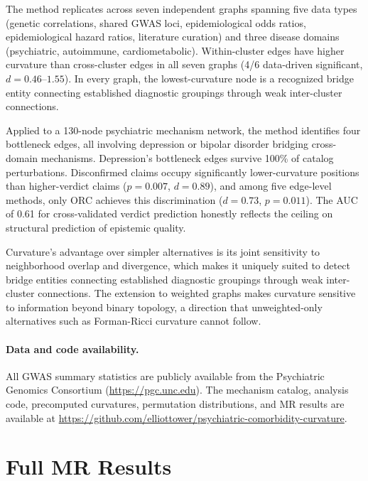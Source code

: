 \documentclass[11pt]{article}
\begin{document}
The method replicates across seven independent graphs spanning five data types (genetic correlations, shared GWAS loci, epidemiological odds ratios, epidemiological hazard ratios, literature curation) and three disease domains (psychiatric, autoimmune, cardiometabolic). Within-cluster edges have higher curvature than cross-cluster edges in all seven graphs (4/6 data-driven significant, $d = 0.46$--$1.55$). In every graph, the lowest-curvature node is a recognized bridge entity connecting established diagnostic groupings through weak inter-cluster connections.

Applied to a 130-node psychiatric mechanism network, the method identifies four bottleneck edges, all involving depression or bipolar disorder bridging cross-domain mechanisms. Depression's bottleneck edges survive 100\% of catalog perturbations. Disconfirmed claims occupy significantly lower-curvature positions than higher-verdict claims ($p = 0.007$, $d = 0.89$), and among five edge-level methods, only ORC achieves this discrimination ($d = 0.73$, $p = 0.011$). The AUC of 0.61 for cross-validated verdict prediction honestly reflects the ceiling on structural prediction of epistemic quality.

Curvature's advantage over simpler alternatives is its joint sensitivity to neighborhood overlap and divergence, which makes it uniquely suited to detect bridge entities connecting established diagnostic groupings through weak inter-cluster connections. The extension to weighted graphs makes curvature sensitive to information beyond binary topology, a direction that unweighted-only alternatives such as Forman-Ricci curvature \citep{sreejith2016forman} cannot follow.

\paragraph{Data and code availability.} All GWAS summary statistics are publicly available from the Psychiatric Genomics Consortium (\url{https://pgc.unc.edu}). The mechanism catalog, analysis code, precomputed curvatures, permutation distributions, and MR results are available at \url{https://github.com/elliottower/psychiatric-comorbidity-curvature}.




\appendix

\section{Full MR Results}
\label{app:mr}
\end{document}
